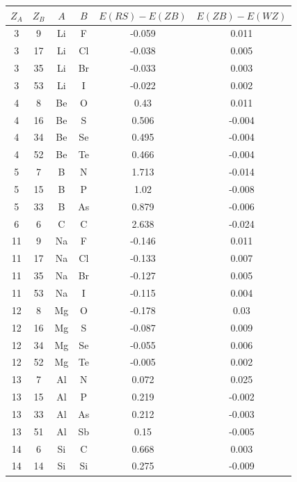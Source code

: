 \documentclass[11pt,oneside,czech,american]{book} %
\theoremstyle{plain}
\theoremstyle{definition}
\begin{document}
\begin{table} 
	\scriptsize
	\begin{minipage}{0.5\textwidth}
		\centering
		\begin{tabular}{cccccc}
			\toprule
			$Z_A$ &   $Z_B$ & $A$   & $B$   &      $E(RS) - E(ZB)$ &     $E(ZB)-E(WZ)$ \\
			\midrule
			3 &     9 & Li  & F   & -0.059 &  0.011 \\
			3 &    17 & Li  & Cl  & -0.038 &  0.005 \\
			3 &    35 & Li  & Br  & -0.033 &  0.003 \\
			3 &    53 & Li  & I   & -0.022 &  0.002 \\
			4 &     8 & Be  & O   &  0.43  &  0.011 \\
			4 &    16 & Be  & S   &  0.506 & -0.004 \\
			4 &    34 & Be  & Se  &  0.495 & -0.004 \\
			4 &    52 & Be  & Te  &  0.466 & -0.004 \\
			5 &     7 & B   & N   &  1.713 & -0.014 \\
			5 &    15 & B   & P   &  1.02  & -0.008 \\
			5 &    33 & B   & As  &  0.879 & -0.006 \\
			6 &     6 & C   & C   &  2.638 & -0.024 \\
			11 &     9 & Na  & F   & -0.146 &  0.011 \\
			11 &    17 & Na  & Cl  & -0.133 &  0.007 \\
			11 &    35 & Na  & Br  & -0.127 &  0.005 \\
			11 &    53 & Na  & I   & -0.115 &  0.004 \\
			12 &     8 & Mg  & O   & -0.178 &  0.03  \\
			12 &    16 & Mg  & S   & -0.087 &  0.009 \\
			12 &    34 & Mg  & Se  & -0.055 &  0.006 \\
			12 &    52 & Mg  & Te  & -0.005 &  0.002 \\
			13 &     7 & Al  & N   &  0.072 &  0.025 \\
			13 &    15 & Al  & P   &  0.219 & -0.002 \\
			13 &    33 & Al  & As  &  0.212 & -0.003 \\
			13 &    51 & Al  & Sb  &  0.15  & -0.005 \\
			14 &     6 & Si  & C   &  0.668 &  0.003 \\
			14 &    14 & Si  & Si  &  0.275 & -0.009 \\

\end{tabular}
\end{minipage}
\end{table}
\end{document}
